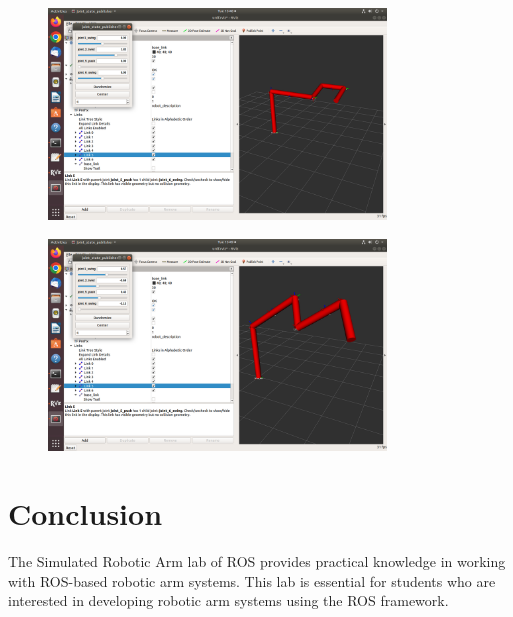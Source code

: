 \documentclass{article} %
\begin{document}
\begin{figure}[h]
	\centering
	\includegraphics[width=0.8\textwidth]{images/ss6.png}
\end{figure}

\newpage

\begin{figure}[h]
	\centering
	\includegraphics[width=0.8\textwidth]{images/ss7.png}
\end{figure}


\section{Conclusion}

The Simulated Robotic Arm lab of ROS provides practical knowledge in working with ROS-based robotic arm systems. This lab is essential for students who are interested in developing robotic arm systems using the ROS framework.
\end{document}
